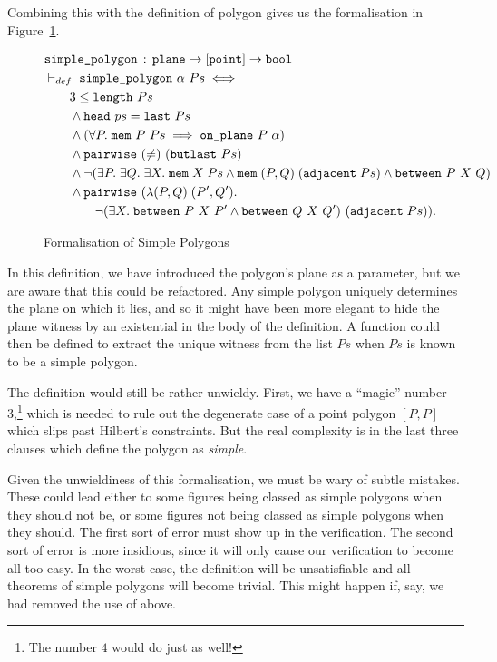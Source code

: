 Combining this with the definition of polygon gives us the formalisation in Figure~\ref{fig:SimplePolygonDef}.

\begin{figure}
\begin{equation}\label{eq:SimplePolygonDef}
  \begin{split}
  &\texttt{simple\_polygon}\,:\,\texttt{plane} \rightarrow [\texttt{point}] \rightarrow \texttt{bool}\\
  &\vdash_{def}\;\texttt{simple\_polygon}\ \alpha\ Ps \iff \\
  &\qquad 3 \leq \texttt{length}\ Ps\\
  &\qquad\wedge \texttt{head}\ ps = \texttt{last}\ Ps\\
  &\qquad\wedge (\forall P.\;\texttt{mem}\ P\ Ps \implies \texttt{on\_plane}\ P\ \alpha)\\
  &\qquad\wedge \texttt{pairwise}\ (\neq)\ (\texttt{butlast}\ Ps)\\
  &\qquad\wedge \neg(\exists P.\;\exists Q.\;\exists X.\; \texttt{mem}\;X\;Ps\wedge\texttt{mem}\;(P,Q)\;(\texttt{adjacent}\;Ps)\wedge\texttt{between}\ P\ X\ Q)\\
  &\qquad\wedge \texttt{pairwise}\ (\lambda(P,Q)\;(P',Q').\\
  &\qquad\qquad\neg(\exists X.\;\texttt{between}\ P\ X\ P' \wedge \texttt{between}\ Q\ X\ Q')\ (\texttt{adjacent}\;Ps)).
  \end{split}
\end{equation}
\caption{Formalisation of Simple Polygons}
\label{fig:SimplePolygonDef}
\end{figure}

In this definition, we have introduced the polygon's plane as a parameter, but we are aware that this could be refactored. Any simple polygon uniquely determines the plane on which it lies, and so it might have been more elegant to hide the plane witness by an existential in the body of the definition. A function could then be defined to extract the unique witness from the list $Ps$ when $Ps$ is known to be a simple polygon. 

The definition would still be rather unwieldy. First, we have a ``magic'' number 3,\footnote{The number $4$ would do just as well!} which is needed to rule out the degenerate case of a point polygon $[P,P]$ which slips past Hilbert's constraints. But the real complexity is in the last three clauses which define the polygon as \emph{simple}. 

Given the unwieldiness of this formalisation, we must be wary of subtle mistakes. These could lead either to some figures being classed as simple polygons when they should not be, or some figures not being classed as simple polygons when they should. The first sort of error must show up in the verification. The second sort of error is more insidious, since it will only cause our verification to become all too easy. In the worst case, the definition will be unsatisfiable and all theorems of simple polygons will become trivial. This might happen if, say, we had removed the use of  above.

